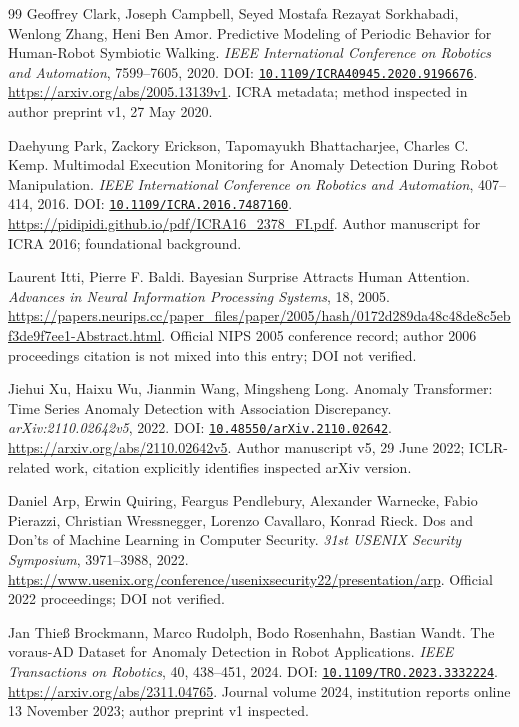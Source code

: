 \begin{thebibliography}{99}
 Geoffrey Clark, Joseph Campbell, Seyed Mostafa Rezayat Sorkhabadi, Wenlong Zhang, Heni Ben Amor. Predictive Modeling of Periodic Behavior for Human-Robot Symbiotic Walking. \emph{IEEE International Conference on Robotics and Automation}, 7599--7605, 2020. DOI: \href{https://doi.org/10.1109/ICRA40945.2020.9196676}{\nolinkurl{10.1109/ICRA40945.2020.9196676}}. \url{https://arxiv.org/abs/2005.13139v1}. ICRA metadata; method inspected in author preprint v1, 27 May 2020.

 Daehyung Park, Zackory Erickson, Tapomayukh Bhattacharjee, Charles C. Kemp. Multimodal Execution Monitoring for Anomaly Detection During Robot Manipulation. \emph{IEEE International Conference on Robotics and Automation}, 407--414, 2016. DOI: \href{https://doi.org/10.1109/ICRA.2016.7487160}{\nolinkurl{10.1109/ICRA.2016.7487160}}. \url{https://pidipidi.github.io/pdf/ICRA16_2378_FI.pdf}. Author manuscript for ICRA 2016; foundational background.

 Laurent Itti, Pierre F. Baldi. Bayesian Surprise Attracts Human Attention. \emph{Advances in Neural Information Processing Systems}, 18, 2005. \url{https://papers.neurips.cc/paper_files/paper/2005/hash/0172d289da48c48de8c5ebf3de9f7ee1-Abstract.html}. Official NIPS 2005 conference record; author 2006 proceedings citation is not mixed into this entry; DOI not verified.

 Jiehui Xu, Haixu Wu, Jianmin Wang, Mingsheng Long. Anomaly Transformer: Time Series Anomaly Detection with Association Discrepancy. \emph{arXiv:2110.02642v5}, 2022. DOI: \href{https://doi.org/10.48550/arXiv.2110.02642}{\nolinkurl{10.48550/arXiv.2110.02642}}. \url{https://arxiv.org/abs/2110.02642v5}. Author manuscript v5, 29 June 2022; ICLR-related work, citation explicitly identifies inspected arXiv version.

 Daniel Arp, Erwin Quiring, Feargus Pendlebury, Alexander Warnecke, Fabio Pierazzi, Christian Wressnegger, Lorenzo Cavallaro, Konrad Rieck. Dos and Don'ts of Machine Learning in Computer Security. \emph{31st USENIX Security Symposium}, 3971--3988, 2022. \url{https://www.usenix.org/conference/usenixsecurity22/presentation/arp}. Official 2022 proceedings; DOI not verified.

 Jan Thieß Brockmann, Marco Rudolph, Bodo Rosenhahn, Bastian Wandt. The voraus-AD Dataset for Anomaly Detection in Robot Applications. \emph{IEEE Transactions on Robotics}, 40, 438--451, 2024. DOI: \href{https://doi.org/10.1109/TRO.2023.3332224}{\nolinkurl{10.1109/TRO.2023.3332224}}. \url{https://arxiv.org/abs/2311.04765}. Journal volume 2024, institution reports online 13 November 2023; author preprint v1 inspected.


\end{thebibliography}
